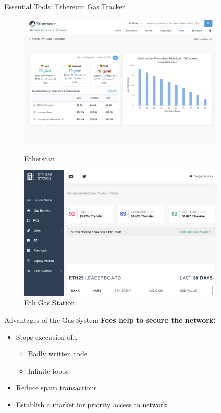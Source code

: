 \documentclass[]{beamer}
\begin{document}
\begin{frame}{Essential Tools: Ethereum Gas Tracker}
	\begin{figure}
	\centering
	\begin{minipage}{.45\textwidth}
  		\centering
  		\includegraphics[width=0.9\textwidth]{../assets/images/Etherscan.png}
  		\caption*{\footnotesize \href{https://etherscan.io/}{\link Etherscan}}
	\end{minipage}
	\begin{minipage}{.45\textwidth}
  		\centering
  		\includegraphics[width=0.9\textwidth]{../assets/images/ethGasStation.png}
  		\caption*{\footnotesize \href{https://www.Ethgasstation.info}{\link Eth Gas Station}}
	\end{minipage}
	\end{figure}
\end{frame}

\begin{frame}{Advantages of the Gas System}
	\textbf{Fees help to secure the network:}
	\begin{itemize}
		\item Stops execution of…
		\begin{itemize}
			\item Badly written code
			\item Infinite loops
		\end{itemize}
		\item Reduce spam transactions
		\item Establish a market for priority access to network
	\end{itemize}
\end{frame}	
\end{document}
